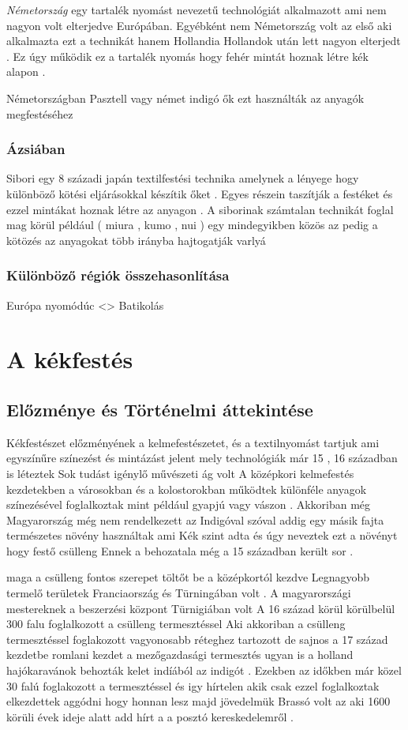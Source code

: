 \documentclass[fontsize=12pt, appendixprefix=true]{scrreprt}
\begin{document}
\textit{Németország} egy tartalék nyomást nevezetű technológiát  alkalmazott  ami  nem nagyon volt elterjedve Európában.
 Egyébként nem Németország volt az első aki alkalmazta  ezt a technikát  hanem Hollandia 
 Hollandok után  lett nagyon elterjedt .
 Ez úgy működik  ez a tartalék nyomás hogy fehér mintát hoznak létre  kék alapon .

 Németországban Pasztell vagy német indigó ők ezt használták az anyagók megfestéséhez 


\subsection{Ázsiában}
Sibori egy 8 századi japán textilfestési technika amelynek a lényege hogy különböző kötési eljárásokkal készítik őket .
Egyes részein taszítják a festéket és ezzel mintákat hoznak létre az anyagon .
A siborinak számtalan technikát foglal mag körül   például ( miura , kumo  , nui  ) egy mindegyikben közös az pedig a kötözés az anyagokat több irányba hajtogatják 
varlyá


\subsection{Különböző régiók összehasonlítása}
   Európa nyomódúc <> Batikolás
\chapter{A kékfestés}
\section{Előzménye és Történelmi áttekintése}
Kékfestészet előzményének a kelmefestészetet, és a textilnyomást tartjuk ami egyszínűre színezést és mintázást jelent  mely technológiák már 15 , 16 században is léteztek 
Sok tudást igénylő művészeti ág volt
A középkori kelmefestés kezdetekben a városokban és a kolostorokban működtek különféle anyagok színezésével foglalkoztak mint például gyapjú vagy vászon . 
Akkoriban még Magyarország még nem rendelkezett az Indigóval szóval addig egy másik fajta természetes növény használtak ami  Kék szint adta és úgy neveztek ezt a növényt hogy festő csülleng 
 Ennek a behozatala még a 15 században került sor .

 maga a csülleng fontos szerepet töltőt be a középkortól kezdve 
 Legnagyobb termelő területek Franciaország és Türningában volt .
 A magyarországi mestereknek a beszerzési központ Türnigiában volt 
 A 16 század körül körülbelül 300 falu foglalkozott a csülleng termesztéssel 
 Aki akkoriban a csülleng termesztéssel foglakozott vagyonosabb réteghez tartozott
 de sajnos a 17 század kezdetbe romlani kezdet a mezőgazdasági termesztés ugyan is a holland hajókaravánok behozták kelet indíából az indigót .
 Ezekben az időkben már közel 30 falú foglakozott a termesztéssel és igy hírtelen akik csak ezzel foglalkoztak elkezdettek aggódni hogy honnan lesz majd jövedelmük 
 Brassó volt az  aki 1600 körüli évek ideje alatt add hírt a a posztó kereskedelemről .
\end{document}
